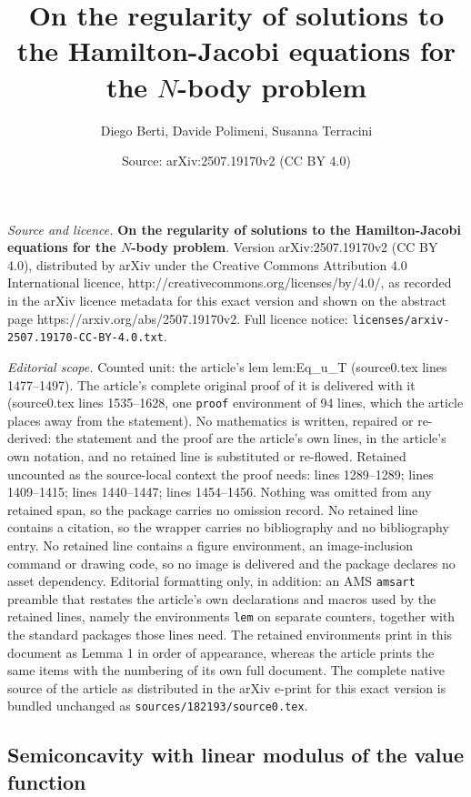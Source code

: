 \documentclass[10pt,a4paper]{amsart}
\title{\textbf{On the regularity of solutions to the Hamilton-Jacobi equations for the $N$-body problem}}
\author{Diego Berti, Davide Polimeni, Susanna Terracini}
\date{Source: arXiv:2507.19170v2 (CC BY 4.0)}
\begin{document}
\maketitle

\noindent\emph{Source and licence.} \textbf{On the regularity of solutions to the Hamilton-Jacobi equations for the $N$-body problem}. Version arXiv:2507.19170v2 (CC BY 4.0), distributed by arXiv under the Creative Commons Attribution 4.0 International licence, http://creativecommons.org/licenses/by/4.0/, as recorded in the arXiv licence metadata for this exact version and shown on the abstract page https://arxiv.org/abs/2507.19170v2. Full licence notice: \texttt{licenses/arxiv-2507.19170-CC-BY-4.0.txt}.\par\smallskip

\noindent\textit{Editorial scope.} Counted unit: the article's lem lem:Eq\_u\_T (source0.tex lines 1477--1497). The article's complete original proof of it is delivered with it (source0.tex lines 1535--1628, one \texttt{proof} environment of 94 lines, which the article places away from the statement). No mathematics is written, repaired or re-derived: the statement and the proof are the article's own lines, in the article's own notation, and no retained line is substituted or re-flowed.  Retained uncounted as the source-local context the proof needs: lines 1289--1289; lines 1409--1415; lines 1440--1447; lines 1454--1456.  Nothing was omitted from any retained span, so the package carries no omission record.  No retained line contains a citation, so the wrapper carries no bibliography and no bibliography entry.  No retained line contains a figure environment, an image-inclusion command or drawing code, so no image is delivered and the package declares no asset dependency.  Editorial formatting only, in addition: an AMS \texttt{amsart} preamble that restates the article's own declarations and macros used by the retained lines, namely the environments \texttt{lem} on separate counters, together with the standard packages those lines need.  The retained environments print in this document as Lemma 1 in order of appearance, whereas the article prints the same items with the numbering of its own full document.  The complete native source of the article as distributed in the arXiv e-print for this exact version is bundled unchanged as \texttt{sources/182193/source0.tex}.
\subsection{Semiconcavity with linear modulus of the value function}\label{sez_semiconcavity}
\end{document}
